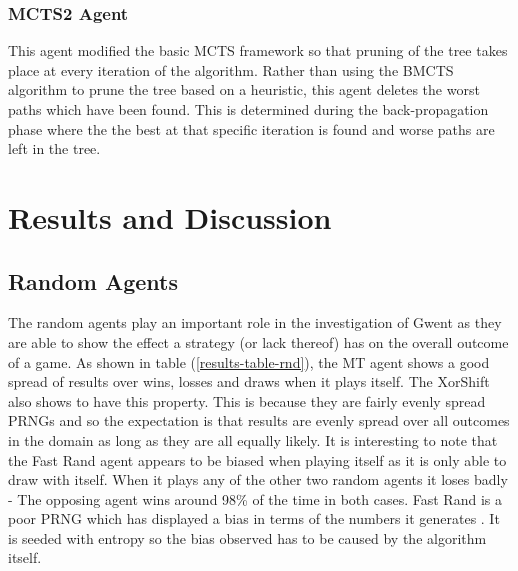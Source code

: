 \documentclass[journal]{IEEEtran}
\begin{document}
  \subsubsection{MCTS2 Agent}
  This agent modified the basic MCTS framework so that pruning of the tree takes place at every iteration of the algorithm. Rather than using the BMCTS algorithm to prune the tree based on a heuristic, this agent deletes the worst paths which have been found. This is determined during the back-propagation phase where the the best at that specific iteration is found and worse paths are left in the tree.

\section{Results and Discussion}
\subsection{Random Agents}
The random agents play an important role in the investigation of Gwent as they are able to show the effect a strategy (or lack thereof) has on the overall outcome of a game. As shown in table (\ref{results-table-rnd}), the MT agent shows a good spread of results over wins, losses and draws when it plays itself. The XorShift also shows to have this property. This is because they are fairly evenly spread PRNGs and so the expectation is that results are evenly spread over all outcomes in the domain as long as they are all equally likely. It is interesting to note that the Fast Rand agent appears to be biased when playing itself as it is only able to draw with itself. When it plays any of the other two random agents it loses badly - The opposing agent wins around 98\% of the time in both cases. Fast Rand is a poor PRNG which has displayed a bias in terms of the numbers it generates \cite{frand}. It is seeded with entropy so the bias observed has to be caused by the algorithm itself. \\
\end{document}
